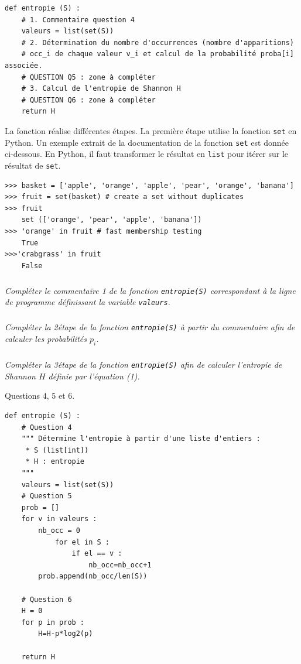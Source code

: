 \documentclass[10pt,fleqn]{article} %
\begin{document}
\begin{lstlisting}
def entropie (S) :
    # 1. Commentaire question 4
    valeurs = list(set(S))
    # 2. Détermination du nombre d'occurrences (nombre d'apparitions) 
    # occ_i de chaque valeur v_i et calcul de la probabilité proba[i] associée.
    # QUESTION Q5 : zone à compléter
    # 3. Calcul de l'entropie de Shannon H
    # QUESTION Q6 : zone à compléter
    return H
\end{lstlisting}

La fonction réalise différentes étapes. La première étape utilise la fonction \texttt{set} en Python. Un exemple extrait de la documentation de la fonction \texttt{set} est donnée
ci-dessous. En Python, il faut transformer le résultat en \texttt{list} pour itérer sur le résultat de \texttt{set}.

\begin{lstlisting}
>>> basket = ['apple', 'orange', 'apple', 'pear', 'orange', 'banana']
>>> fruit = set(basket) # create a set without duplicates
>>> fruit
    set (['orange', 'pear', 'apple', 'banana'])
>>> 'orange' in fruit # fast membership testing
    True
>>>'crabgrass' in fruit
    False
\end{lstlisting}

\fi

\subparagraph{}\textit{Compléter le commentaire 1 de la fonction \texttt{entropie(S)} correspondant à la ligne de programme définissant la variable \texttt{valeurs}.}
\ifprof
\begin{corrige}
\end{corrige}
\else
\fi


\subparagraph{}\textit{Compléter la 2\ieme étape de la fonction \texttt{entropie(S)} à partir du commentaire afin de calculer les probabilités $p_i$.}
\ifprof
\begin{corrige}
\end{corrige}
\else
\fi


\subparagraph{}\textit{Compléter la 3\ieme étape de la fonction \texttt{entropie(S)} afin de calculer l’entropie de Shannon
$H$ définie par l’équation (1).}
\ifprof
\begin{corrige}
Questions 4, 5 et 6.

\begin{lstlisting}
def entropie (S) :
    # Question 4
    """ Détermine l'entropie à partir d'une liste d'entiers :
     * S (list[int])
     * H : entropie
    """ 
    valeurs = list(set(S))
    # Question 5
    prob = []
    for v in valeurs :
        nb_occ = 0
        	for el in S : 
        	    if el == v :
        	        nb_occ=nb_occ+1
        prob.append(nb_occ/len(S))

    # Question 6        
    H = 0
    for p in prob : 
        H=H-p*log2(p)
   
    return H
\end{lstlisting}
\end{corrige}
\else
\fi
\end{document}
